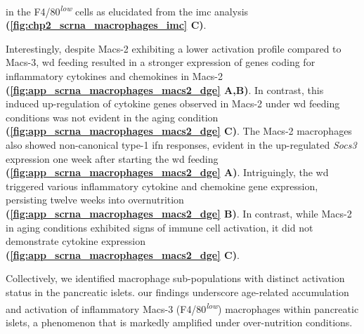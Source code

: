 in the F4/80\textsuperscript{\textit{low}} cells as elucidated from the \gls{imc} analysis \textbf{(\autoref{fig:chp2_scrna_macrophages_imc} C)}.\\
\par Interestingly, despite Macs-2 exhibiting a lower activation profile compared to Macs-3, \gls{wd} feeding resulted in a stronger expression of genes coding for inflammatory cytokines and chemokines in Macs-2 \textbf{(\autoref{fig:app_scrna_macrophages_macs2_dge} A,B)}. In contrast, this induced up-regulation of cytokine genes observed in Macs-2 under \gls{wd} feeding conditions was not evident in the aging condition \textbf{(\autoref{fig:app_scrna_macrophages_macs2_dge} C)}. The Macs-2 macrophages also showed non-canonical type-1 \gls{ifn} responses, evident in the up-regulated \textit{Socs3} expression one week after starting the \gls{wd} feeding \textbf{(\autoref{fig:app_scrna_macrophages_macs2_dge} A)}. Intriguingly, the \gls{wd} triggered various inflammatory cytokine and chemokine gene expression, persisting twelve weeks into overnutrition \textbf{(\autoref{fig:app_scrna_macrophages_macs2_dge} B)}. In contrast, while Macs-2 in aging conditions exhibited signs of immune cell activation, it did not demonstrate cytokine expression \textbf{(\autoref{fig:app_scrna_macrophages_macs2_dge} C)}.\\

\par Collectively, we identified macrophage sub-populations with distinct activation status in the pancreatic islets. our findings underscore age-related accumulation and activation of inflammatory Macs-3 (F4/80\textsuperscript{\textit{low}}) macrophages within pancreatic islets, a phenomenon that is markedly amplified under over-nutrition conditions.



